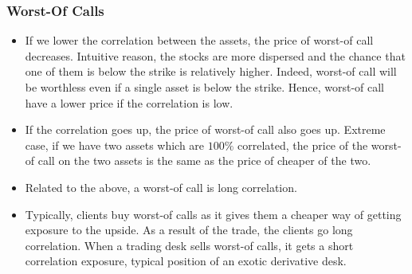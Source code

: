 \documentclass{amsart}
\theoremstyle{plain}
\numberwithin{equation}{section}
\begin{document}
\subsubsection{Worst-Of Calls}
\begin{itemize}	
	\item If we lower the correlation between the assets, the price of worst-of call 
			  decreases. Intuitive reason, the stocks are more dispersed and the chance that one 
				of them is below the strike is relatively higher. Indeed, worst-of call will be 
				worthless even if a single asset is below the strike. Hence, worst-of call have a lower
				price if the correlation is low.
	\item If the correlation goes up, the price of worst-of call also goes up. Extreme case, if
				we have two assets which are $100\%$ correlated, the price of the worst-of call on the 
				two assets is the same as the price of cheaper of the two.
				
	\item Related to the above, a worst-of call is long correlation.
	\item Typically, clients buy worst-of calls as it gives them a cheaper way of 
				getting exposure to the upside. As a result of the trade, the clients go 
				long correlation. When a trading 
				desk sells worst-of calls, it gets a short correlation exposure, 
				typical position of an exotic derivative desk.
				
\end{itemize}
\end{document}
